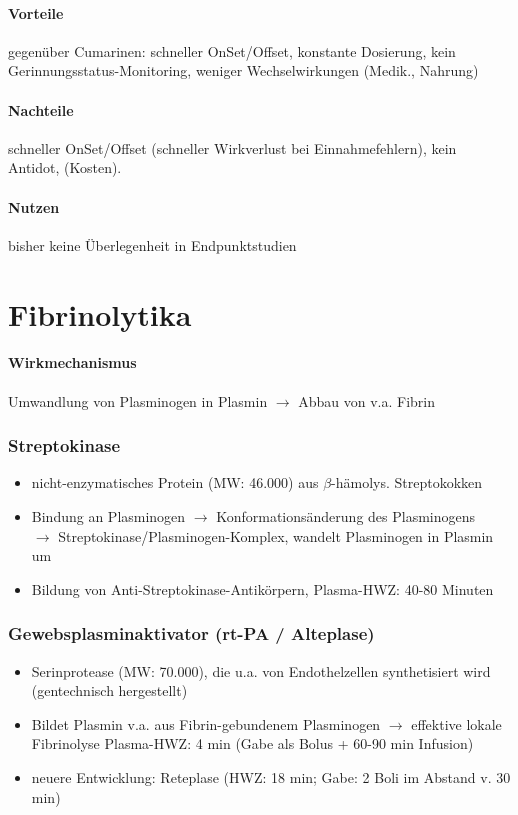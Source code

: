 \documentclass[10pt,a4paper]{report}
\begin{document}
\paragraph{Vorteile} %
\label{par:vorteile}
gegenüber Cumarinen: schneller OnSet/Offset, konstante Dosierung, kein Gerinnungsstatus-Monitoring, weniger Wechselwirkungen (Medik., Nahrung)
\paragraph{Nachteile} %
\label{par:nachteile}
schneller OnSet/Offset (schneller Wirkverlust bei Einnahmefehlern), kein Antidot, (Kosten).
\paragraph{Nutzen} %
\label{par:nutzen}
bisher keine Überlegenheit in Endpunktstudien
\section{Fibrinolytika} %
\label{sec:fibrinolytika}
\paragraph{Wirkmechanismus} %
\label{par:wirkmechanismus}
Umwandlung von Plasminogen in Plasmin $\rightarrow$ Abbau von v.a. Fibrin
\subsubsection{Streptokinase} %
\label{ssub:streptokinase}
\begin{itemize}
	\item nicht-enzymatisches Protein (MW: 46.000) aus $\beta$-hämolys. Streptokokken 
	\item Bindung an Plasminogen $\rightarrow$ Konformationsänderung  des Plasminogens \\
	$\rightarrow$ Streptokinase/Plasminogen-Komplex, wandelt Plasminogen in Plasmin um
	\item Bildung von Anti-Streptokinase-Antikörpern, Plasma-HWZ: 40-80 Minuten
\end{itemize}
\subsubsection{Gewebsplasminaktivator (rt-PA / Alteplase)} %
\label{ssub:gewebsplasminaktivator_rt_pa_alteplase_}
\begin{itemize}
	\item Serinprotease (MW: 70.000), 
	die u.a. von Endothelzellen synthetisiert wird (gentechnisch hergestellt)
	\item Bildet Plasmin v.a. aus Fibrin-gebundenem Plasminogen 
	$\rightarrow$ effektive lokale Fibrinolyse Plasma-HWZ: 4 min (Gabe als Bolus + 60-90 min Infusion)
	\item neuere Entwicklung: Reteplase (HWZ: 18 min; Gabe: 2 Boli im Abstand v. 30 min)
\end{itemize}
\end{document}
